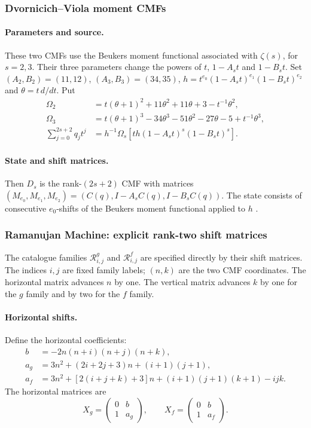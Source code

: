 \documentclass[oneside,english,11pt]{amsart}
\begin{document}
\subsubsection{Dvornicich--Viola moment CMFs}
\smallskip
\paragraph{\textbf{Parameters and source.}}
These two CMFs use the Beukers moment functional associated with
$\zeta(s)$, for $s=2,3$. Their three parameters change the powers of
$t$, $1-A_st$ and $1-B_st$. Set $(A_2,B_2)=(11,12)$, $(A_3,B_3)=(34,35)$,
$h=t^{e_0}(1-A_st)^{e_1}(1-B_st)^{e_2}$ and $\theta=t\,d/dt$. Put
\[
\begin{aligned}
\Omega_2&=t(\theta+1)^2+11\theta^2+11\theta+3-t^{-1}\theta^2,\\
\Omega_3&=t(\theta+1)^3-34\theta^3-51\theta^2-27\theta-5+t^{-1}\theta^3,\\
\sum_{j=0}^{2s+2}q_jt^j&=h^{-1}\Omega_s[th(1-A_st)^s(1-B_st)^s].
\end{aligned}
\]
\smallskip
\paragraph{\textbf{State and shift matrices.}}
Then $D_s$ is the rank-$(2s+2)$ CMF with matrices
$(M_{e_0},M_{e_1},M_{e_2})=(C(q),I-A_sC(q),I-B_sC(q))$.
The state consists of consecutive $e_0$-shifts of the Beukers moment
functional applied to $h$ \cite{dvornicichViola1990}.

\subsubsection{Ramanujan Machine: explicit rank-two shift matrices}
The catalogue families $\mathcal R^g_{i,j}$ and $\mathcal R^f_{i,j}$
are specified directly by their shift matrices. The indices $i,j$ are
fixed family labels; $(n,k)$ are the two CMF coordinates. The horizontal
matrix advances $n$ by one. The vertical matrix advances $k$ by one
for the $g$ family and by two for the $f$ family.

\smallskip
\paragraph{\textbf{Horizontal shifts.}}
Define the horizontal coefficients: \[
\begin{aligned}
 b&=-2n(n+i)(n+j)(n+k),\\
 a_g&=3n^2+(2i+2j+3)n+(i+1)(j+1),\\
 a_f&=3n^2+[2(i+j+k)+3]n+(i+1)(j+1)(k+1)-ijk.
\end{aligned}
\]
The horizontal matrices are
\[
 X_g=\begin{pmatrix}0&b\\1&a_g\end{pmatrix},\qquad
 X_f=\begin{pmatrix}0&b\\1&a_f\end{pmatrix}.
\]
\smallskip
\end{document}
